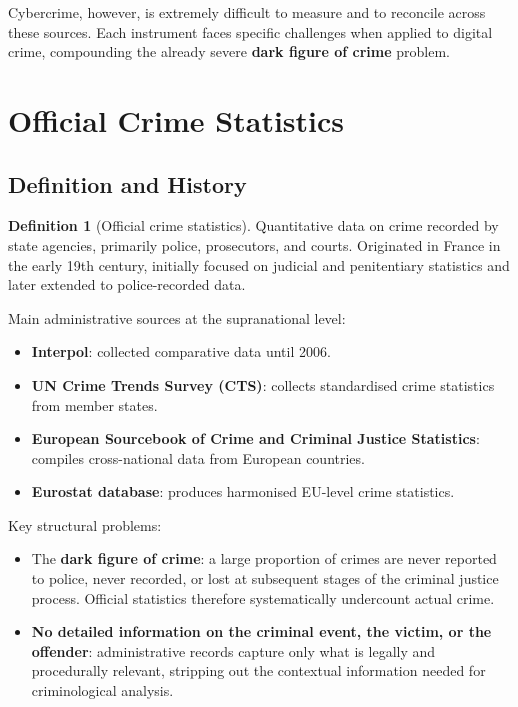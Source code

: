 \documentclass[11pt,a4paper,openany]{report}
\theoremstyle{definition}
\newtheorem{definition}{Definition}[chapter]
\theoremstyle{plain}
\theoremstyle{remark}
\begin{document}
Cybercrime, however, is extremely difficult to measure and to reconcile across these sources. Each instrument faces specific challenges when applied to digital crime, compounding the already severe \textbf{dark figure of crime} problem.

\section{Official Crime Statistics}

\subsection{Definition and History}

\begin{definition}[Official crime statistics]
Quantitative data on crime recorded by state agencies, primarily police, prosecutors, and courts. Originated in France in the early 19th century, initially focused on judicial and penitentiary statistics and later extended to police-recorded data.
\end{definition}

Main administrative sources at the supranational level:
\begin{itemize}
    \item \textbf{Interpol}: collected comparative data until 2006.
    \item \textbf{UN Crime Trends Survey (CTS)}: collects standardised crime statistics from member states.
    \item \textbf{European Sourcebook of Crime and Criminal Justice Statistics}: compiles cross-national data from European countries.
    \item \textbf{Eurostat database}: produces harmonised EU-level crime statistics.
\end{itemize}

Key structural problems:
\begin{itemize}
    \item The \textbf{dark figure of crime}: a large proportion of crimes are never reported to police, never recorded, or lost at subsequent stages of the criminal justice process. Official statistics therefore systematically undercount actual crime.
    \item \textbf{No detailed information on the criminal event, the victim, or the offender}: administrative records capture only what is legally and procedurally relevant, stripping out the contextual information needed for criminological analysis.
\end{itemize}
\end{document}
